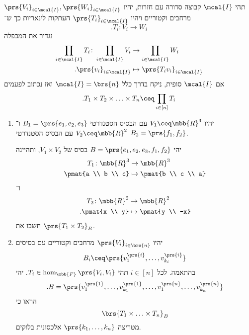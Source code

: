 \documentclass[a4paper,10pt,oneside,openany]{article}
\begin{document}
\begin{solution}
\end{solution}

\begin{definition}
תהי
$\mcal{I}$
קבוצה סדורה עם חזרות, יהיו
$\prs{V_i}_{i \in \mcal{I}}, \prs{W_i}_{i \in \mcal{I}}$
מרחבים וקטוריים ויהיו
$\prs{T_i}_{i \in \mcal{I}}$
העתקות לינאריות כך ש־%
\[\text{.} T_i \colon V_i \to W_i\]
נגדיר את המכפלה
\begin{align*}
\prod_{i \in \mcal{I}} T_i \colon \prod_{i \in \mcal{I}} V_i &\to \prod_{i \in \mcal{I}} W_i \\
\text{.} \prs{v_i}_{i \in \mcal{I}} &\mapsto \prs{T_i v_i}_{i \in \mcal{I}}
\end{align*}
אם
$\mcal{I}$
סופית, ניקח בדרך כלל
$\mcal{I} = \brs{n}$
ואז נכתוב לפעמים
\[\text{.} T_1 \times T_2 \times \ldots \times T_n \ceq \prod_{i \in [n]} T_i\]
\end{definition}

\begin{exercise}
\begin{enumerate}
\item יהיו
$V_1 \ceq \mbb{R}^3$
עם הבסיס הסטנדרטי
$B_1 = \prs{e_1, e_2, e_3}$
ו־%
$V_2 \ceq \mbb{R}^2$
עם הבסיס הסטנדרטי
$B_2 = \prs{f_1, f_2}$.

יהי
$B = \prs{e_1, e_2, e_3, f_1, f_2}$
בסיס של
$V_1 \times V_2$,
ותהיינה
\begin{align*}
T_1 \colon \mbb{R}^3 &\to \mbb{R}^3 \\
\pmat{a \\ b \\ c} &\mapsto \pmat{b \\ c \\ a}
\end{align*}
ו־%
\begin{align*}
T_2 \colon \mbb{R}^2 &\to \mbb{R}^2 \\
\text{.} \pmat{x \\ y} &\mapsto \pmat{y \\ -x}
\end{align*}
חשבו את
$\prs{T_1 \times T_2}_B$.

\item יהיו
$\prs{V_i}_{i \in \brs{n}}$
מרחבים וקטוריים עם בסיסים
\[B_i \ceq \prs{v^{\prs{i}}_1, \ldots, v^{\prs{i}}_{k_i}}\]
בהתאמה.
לכל
$i \in [n]$
תהי
$T_i \in \hom_{\mbb{F}}\prs{V_i, V_i}$.
יהי
\[\text{.} B = \prs{v^{\prs{1}}_1, \ldots, v^{\prs{1}}_{k_1}, \ldots, v^{\prs{n}}_1, \ldots, v^{\prs{n}}_{k_n}}\]
הראו כי
\[\brs{T_1 \times \ldots \times T_n}_B\]
מטריצה
$\prs{k_1, \ldots, k_n}$%
אלכסונית בלוקים.
\end{enumerate}
\end{exercise}
\end{document}
